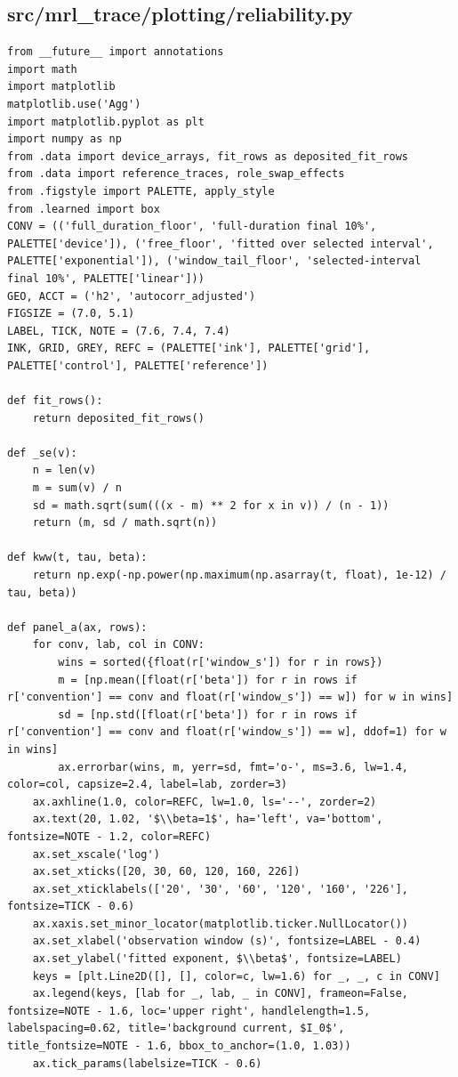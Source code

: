\documentclass[a4paper,10pt]{article}
\begin{document}
\subsection{src/mrl\_trace/plotting/reliability.py}
\begin{Verbatim}
from __future__ import annotations
import math
import matplotlib
matplotlib.use('Agg')
import matplotlib.pyplot as plt
import numpy as np
from .data import device_arrays, fit_rows as deposited_fit_rows
from .data import reference_traces, role_swap_effects
from .figstyle import PALETTE, apply_style
from .learned import box
CONV = (('full_duration_floor', 'full-duration final 10%', PALETTE['device']), ('free_floor', 'fitted over selected interval', PALETTE['exponential']), ('window_tail_floor', 'selected-interval final 10%', PALETTE['linear']))
GEO, ACCT = ('h2', 'autocorr_adjusted')
FIGSIZE = (7.0, 5.1)
LABEL, TICK, NOTE = (7.6, 7.4, 7.4)
INK, GRID, GREY, REFC = (PALETTE['ink'], PALETTE['grid'], PALETTE['control'], PALETTE['reference'])

def fit_rows():
    return deposited_fit_rows()

def _se(v):
    n = len(v)
    m = sum(v) / n
    sd = math.sqrt(sum(((x - m) ** 2 for x in v)) / (n - 1))
    return (m, sd / math.sqrt(n))

def kww(t, tau, beta):
    return np.exp(-np.power(np.maximum(np.asarray(t, float), 1e-12) / tau, beta))

def panel_a(ax, rows):
    for conv, lab, col in CONV:
        wins = sorted({float(r['window_s']) for r in rows})
        m = [np.mean([float(r['beta']) for r in rows if r['convention'] == conv and float(r['window_s']) == w]) for w in wins]
        sd = [np.std([float(r['beta']) for r in rows if r['convention'] == conv and float(r['window_s']) == w], ddof=1) for w in wins]
        ax.errorbar(wins, m, yerr=sd, fmt='o-', ms=3.6, lw=1.4, color=col, capsize=2.4, label=lab, zorder=3)
    ax.axhline(1.0, color=REFC, lw=1.0, ls='--', zorder=2)
    ax.text(20, 1.02, '$\\beta=1$', ha='left', va='bottom', fontsize=NOTE - 1.2, color=REFC)
    ax.set_xscale('log')
    ax.set_xticks([20, 30, 60, 120, 160, 226])
    ax.set_xticklabels(['20', '30', '60', '120', '160', '226'], fontsize=TICK - 0.6)
    ax.xaxis.set_minor_locator(matplotlib.ticker.NullLocator())
    ax.set_xlabel('observation window (s)', fontsize=LABEL - 0.4)
    ax.set_ylabel('fitted exponent, $\\beta$', fontsize=LABEL)
    keys = [plt.Line2D([], [], color=c, lw=1.6) for _, _, c in CONV]
    ax.legend(keys, [lab for _, lab, _ in CONV], frameon=False, fontsize=NOTE - 1.6, loc='upper right', handlelength=1.5, labelspacing=0.62, title='background current, $I_0$', title_fontsize=NOTE - 1.6, bbox_to_anchor=(1.0, 1.03))
    ax.tick_params(labelsize=TICK - 0.6)


\end{Verbatim}
\end{document}
